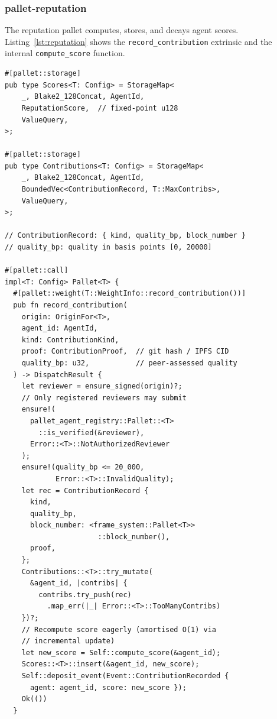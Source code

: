 \documentclass[conference]{IEEEtran}
\begin{document}
\subsubsection{pallet-reputation}

The reputation pallet computes, stores, and decays agent scores. Listing~\ref{lst:reputation} shows the \texttt{record\_contribution} extrinsic and the internal \texttt{compute\_score} function.

\begin{lstlisting}[language=Pseudocode, caption={pallet-reputation: contribution recording and score computation (Rust/FRAME pseudocode)}, label={lst:reputation}, basicstyle=\ttfamily\tiny, frame=single, breaklines=true, xleftmargin=1em, keywordstyle=\color{clawblue}\bfseries, commentstyle=\color{clawgray}]
#[pallet::storage]
pub type Scores<T: Config> = StorageMap<
    _, Blake2_128Concat, AgentId,
    ReputationScore,  // fixed-point u128
    ValueQuery,
>;

#[pallet::storage]
pub type Contributions<T: Config> = StorageMap<
    _, Blake2_128Concat, AgentId,
    BoundedVec<ContributionRecord, T::MaxContribs>,
    ValueQuery,
>;

// ContributionRecord: { kind, quality_bp, block_number }
// quality_bp: quality in basis points [0, 20000]

#[pallet::call]
impl<T: Config> Pallet<T> {
  #[pallet::weight(T::WeightInfo::record_contribution())]
  pub fn record_contribution(
    origin: OriginFor<T>,
    agent_id: AgentId,
    kind: ContributionKind,
    proof: ContributionProof,  // git hash / IPFS CID
    quality_bp: u32,           // peer-assessed quality
  ) -> DispatchResult {
    let reviewer = ensure_signed(origin)?;
    // Only registered reviewers may submit
    ensure!(
      pallet_agent_registry::Pallet::<T>
        ::is_verified(&reviewer),
      Error::<T>::NotAuthorizedReviewer
    );
    ensure!(quality_bp <= 20_000,
            Error::<T>::InvalidQuality);
    let rec = ContributionRecord {
      kind,
      quality_bp,
      block_number: <frame_system::Pallet<T>>
                      ::block_number(),
      proof,
    };
    Contributions::<T>::try_mutate(
      &agent_id, |contribs| {
        contribs.try_push(rec)
          .map_err(|_| Error::<T>::TooManyContribs)
    })?;
    // Recompute score eagerly (amortised O(1) via
    // incremental update)
    let new_score = Self::compute_score(&agent_id);
    Scores::<T>::insert(&agent_id, new_score);
    Self::deposit_event(Event::ContributionRecorded {
      agent: agent_id, score: new_score });
    Ok(())
  }


\end{lstlisting}
\end{document}
